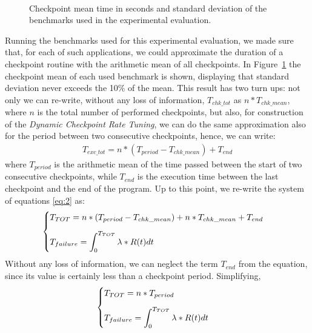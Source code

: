 \begin{figure}[H]
    \centering
    \\
    \vspace{1.1em}
    \caption{Checkpoint mean time in seconds and standard deviation of the benchmarks used in the experimental evaluation.}
    \label{fig:chk_mean}%
\end{figure}
Running the benchmarks used for this experimental evaluation, we made sure that, for each of such applications, we could approximate the duration of a checkpoint routine with the arithmetic mean of all checkpoints. In Figure~\ref{fig:chk_mean} the checkpoint mean of each used benchmark is shown, displaying that standard deviation never exceeds the 10\% of the mean. This result has two turn ups: not only we can re-write, without any loss of information, $T_{chk\_tot}$ as $n* T_{chk\_mean}$, where $n$ is the total number of performed checkpoints, but also, for construction of the \emph{Dynamic Checkpoint Rate Tuning}, we can do the same approximation also for the period between two consecutive checkpoints, hence, we can write:
\begin{align}
    T_{exc\_tot} = n*(T_{period} - T_{chk\_mean}) + T_{end}
\end{align}  
where $T_{period}$ is the arithmetic mean of the time passed between the start of two consecutive checkpoints, while $T_{end}$ is the execution time between the last checkpoint and the end of the program.
Up to this point, we re-write the system of equations \ref{eq:2} as:
\begin{align}\label{eq:4}
    \begin{cases}
    T_{TOT} = n*(T_{period} - T_{chk\_mean}) + n*T_{chk\_mean} + T_{end}\\
    \noalign{\vskip9pt}
    T_{failure} =  \displaystyle\int_0^{T_{TOT}}\lambda * R(t)dt
    \end{cases}
\end{align}
 Without any loss of information, we can neglect the term $T_{end}$ from the equation, since its value is certainly less than a checkpoint period. Simplifying,
\begin{align}
    \begin{cases}
        T_{TOT} = n*T_{period}\\
        \noalign{\vskip9pt}
        T_{failure} = \displaystyle\int_0^{T_{TOT}}\lambda * R(t)dt
    \end{cases}
\end{align}
